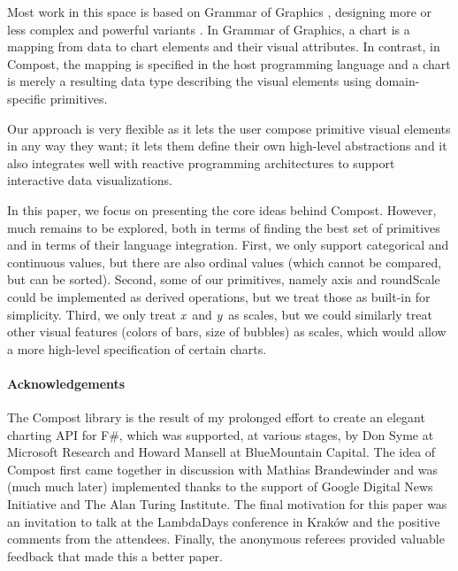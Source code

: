 \documentclass{jfp}
\newcommand{\X}{\emph{x}\ }
\newcommand{\Y}{\emph{y}\ }
\newcommand{\kvd}[1]{\textnormal{\textcolor{kvdclr}{\sffamily #1}}}
\begin{document}
Most work in this space is based on Grammar of Graphics \cite{grammar}, designing more or less complex and
powerful variants \cite{layered,vega-lite,vega,polaris}. In Grammar of Graphics, a chart is a mapping from
data to chart elements and their visual attributes. In contrast, in Compost, the mapping is
specified in the host programming language and a chart is merely a resulting data type
describing the visual elements using domain-specific primitives.

Our approach is very flexible as it lets the user compose primitive visual elements in any
way they want; it lets them define their own high-level abstractions and it also integrates well
with reactive programming architectures to support interactive data visualizations.

In this paper, we focus on presenting the core ideas behind Compost. However, much
remains to be explored, both in terms of finding the best set of primitives and in terms of
their language integration. First, we only support categorical and continuous values, but
there are also ordinal values (which cannot be compared, but can be sorted). Second, some of our
primitives, namely \kvd{axis} and \kvd{roundScale} could be implemented as derived operations, but
we treat those as built-in for simplicity. Third, we only treat \X and \Y as scales, but we could
similarly treat other visual features (colors of bars, size of bubbles) as scales, which would
allow a more high-level specification of certain charts.

\paragraph{Acknowledgements}
The Compost library is the result of my prolonged effort to create an elegant charting API for
F\#, which was supported, at various stages, by Don Syme at Microsoft Research and Howard Mansell
at BlueMountain Capital. The idea of Compost first came together in discussion with Mathias
Brandewinder and was (much much later) implemented thanks to the support of Google Digital News
Initiative and The Alan Turing Institute. The final motivation for this paper was an invitation
to talk at the LambdaDays conference in Krak\'ow and the positive comments from the attendees.
Finally, the anonymous referees provided valuable feedback that made this a better paper.



\end{document}
